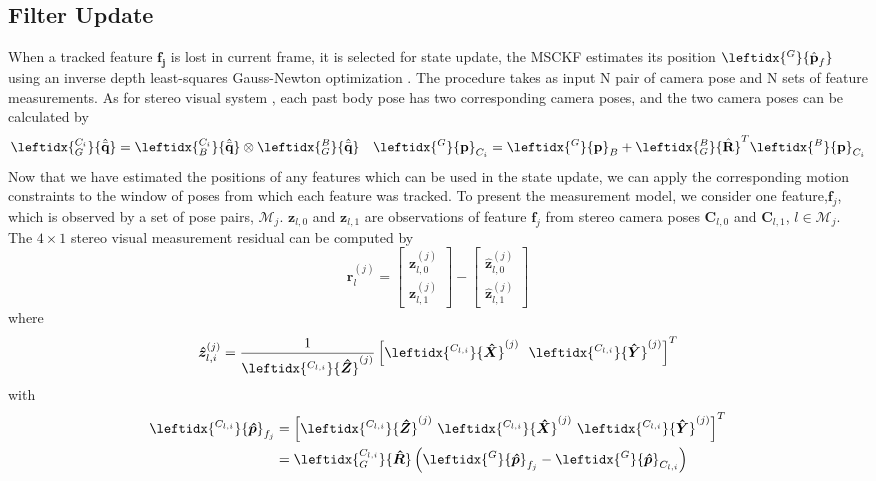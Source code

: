 \documentclass[a4paper, 10pt, conference]{ieeeconf}      %
\begin{document}
\subsection{Filter Update}
When a tracked feature $ \bm {f_j} $ is lost in current frame, it is selected for state update, the MSCKF estimates its position  $  \leftidx{^G}{\hat {\textbf p}_f} $ using an inverse depth \cite{montiel2006unified} least-squares Gauss-Newton optimization \cite{hartley2003multiple}. The procedure takes as input N pair of camera pose and N sets of feature measurements. As for stereo visual system , each past body pose has two corresponding camera poses, and the two camera poses can be calculated by 
\begin{equation}
 \leftidx{_G^{C_i}}{{\hat {\bar {\textbf q}}}}=   \leftidx{_B^{C_i}}{{\hat {\bar {\textbf q}}}} \otimes
 \leftidx{_G^{B}}{{\hat {\bar {\textbf q}}}}  \ \ \  {\leftidx{^G}{\textbf p}_{C_i}} =  {\leftidx{^G}{\textbf p}_{B}}+ \leftidx{_G^B}{\hat {\textbf R}}^T{\leftidx{^B}{\textbf p}_{C_i}} 
\end{equation}
Now that we have estimated the positions of any features
which can be used in the state update, we can apply the corresponding motion constraints to the window of poses from which each feature was tracked. To present the measurement model, we consider one feature,$ \bm f_j $, which is observed by a set of pose pairs, $ \mathcal M_j $. $ \bm z_{l,0} $ and $ \bm z_{l,1} $  are observations of feature $ \bm f_j $ from  stereo camera poses $ \bm C_{l,0} $ and $ \bm C_{l,1}$, $ l \in \mathcal M_j $. The $ 4 \times 1 $ stereo visual  measurement residual can be computed by
\begin{equation}
\bm {r}_l^{(j)} = \left[ \begin{matrix} \bm z_{l,0}^{(j)} \\ \bm z_{l,1}^{(j)} \end{matrix}\right] - \left[ \begin{matrix} \bm {\hat z}_{l,0}^{(j)} \\ \bm {\hat z}_{l,1}^{(j)} \end{matrix}\right] 
\end{equation}
where
\begin{equation}
 \bm {\hat z}_{l,i}^{(j)} = \frac{1}{\leftidx{^{C_{l,i}}}{\bm {\hat Z}}^{(j)}}\left[ \leftidx{^{C_{l,i}}}{\bm {\hat X}}^{(j)} \ \ \leftidx{^{C_{l,i}}}{\bm {\hat Y}}^{(j)} \right]^T
\end{equation}
with 
\begin{equation}
\begin{split}
{\leftidx{^{C_{l,i}}}{\bm{\hat p} }_{f_j}}& =  \left[ \leftidx{^{C_{l,i}}}{\bm {\hat Z}}^{(j)} \  \leftidx{^{C_{l,i}}}{\bm {\hat X}}^{(j)} \  \leftidx{^{C_{l,i}}}{\bm {\hat Y}}^{(j)} \right]^T \\
& =  \leftidx{_G^{C_{l,i}}}{\bm {\hat R}}\left({\leftidx{^{G}}{\bm {\hat p} }_{f_j}}-{\leftidx{^{G}}{\bm {\hat p}}_{C_{l,i}}} \right) 
\end{split}
\end{equation}
\end{document}

